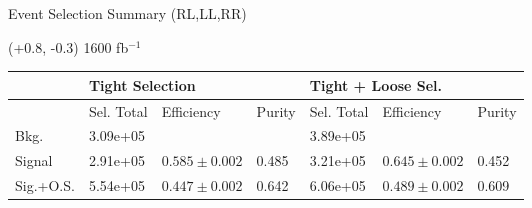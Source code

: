 \documentclass[10pt]{beamer}
\begin{document}
\begin{frame}{Event Selection Summary (RL,LL,RR)}

\tiny
(+0.8, -0.3) 1600 fb$^{-1}$\\
 \begin{tabular}{ |p{}|p{}p{}|p{}|p{}p{}p{}|} 
 \hline 
   &  \multicolumn{3}{|l|}{Tight Selection} &  \multicolumn{3}{|l|}{ Tight + Loose Sel.}  \\  \hline  
 & Sel. Total & Efficiency & Purity & Sel. Total & Efficiency & Purity \\ 
 \hline  
 Bkg. & 3.09e+05 & & & 3.89e+05 & &  \\ 
 Signal & 2.91e+05 & $0.585 \pm 0.002$ & 0.485 & 3.21e+05 & $0.645 \pm 0.002$ & 0.452 \\ 
 Sig.+O.S. & 5.54e+05 & $0.447 \pm 0.002$ & 0.642 & 6.06e+05 & $0.489 \pm 0.002$ & 0.609 \\ 
\hline 
\end{tabular} 


\end{frame}
\end{document}
